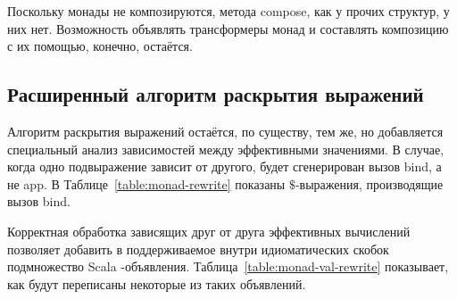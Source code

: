 Поскольку монады не композируются, метода \<compose\>, как у прочих структур, у них нет. Возможность объявлять трансформеры монад и составлять композицию с их помощью, конечно, остаётся.

\subsection{Расширенный алгоритм раскрытия выражений}
Алгоритм раскрытия выражений остаётся, по существу, тем же, но добавляется специальный анализ зависимостей между эффективными значениями. В случае, когда одно подвыражение зависит от другого, будет сгенерирован вызов \<bind\>, а не \<app\>. В Таблице~\ref{table:monad-rewrite} показаны $\$$-выражения, производящие вызов \<bind\>.

Корректная обработка зависящих друг от друга эффективных вычислений позволяет добавить в поддерживаемое внутри идиоматических скобок подмножество Scala \<\>-объявления. Таблица~\ref{table:monad-val-rewrite} показывает, как будут переписаны некоторые из таких объявлений.


